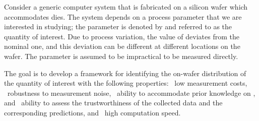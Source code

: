 Consider a generic computer system that is fabricated on a silicon wafer which
accommodates \nd dies. The system depends on a process parameter that we are
interested in studying; the parameter is denoted by \g and referred to as the
quantity of interest. Due to process variation, the value of \g deviates from
the nominal one, and this deviation can be different at different locations on
the wafer. The parameter is assumed to be impractical to be measured directly.

The goal is to develop a framework for identifying the on-wafer distribution of
the quantity of interest \g with the following properties: \one~low measurement
costs, \two~robustness to measurement noise, \three~ability to accommodate prior
knowledge on \g, and \four~ability to assess the trustworthiness of the
collected data and the corresponding predictions, and \five~high computation
speed.
